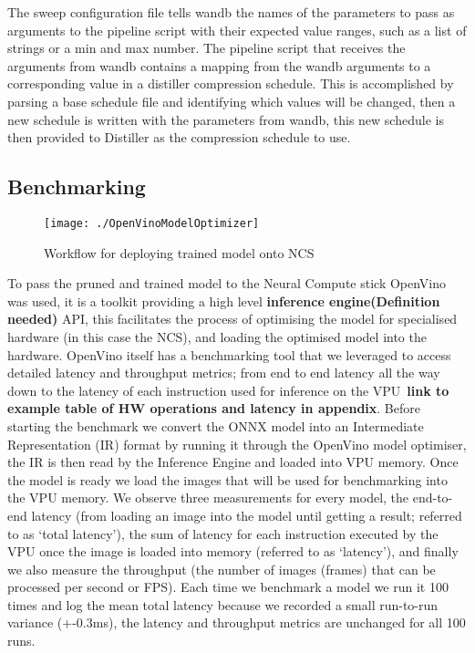 \documentclass[../Dissertation.tex]{subfiles}
\begin{document}
The sweep configuration file tells \acrshort{wandb} the names of the parameters to pass as arguments to the pipeline script with their expected value ranges, such as a list of strings or a min and max number. 
The pipeline script that receives the arguments from \acrshort{wandb} contains a mapping from the \acrshort{wandb} arguments to a corresponding value in a distiller compression schedule.
This is accomplished by parsing a base schedule file and identifying which values will be changed, then a new schedule is written with the parameters from \acrshort{wandb}, this new schedule is then provided to Distiller as the compression schedule to use.



\subsection{Benchmarking}

\begin{figure}[H]
	\centering
	\texttt{[image: ./OpenVinoModelOptimizer]}
	\caption{Workflow for deploying trained model onto NCS~\autocite{ModelOptimizerDeveloper}}
	\label{fig:OpenVinoWorkflow}
\end{figure}


To pass the pruned and trained model to the Neural Compute stick OpenVino was used, it is a toolkit providing a high level \textbf{inference engine(\color{red}Definition needed)} API, this facilitates the process of optimising the model for specialised hardware (in this case the NCS), and loading the optimised model into the hardware. 
OpenVino itself has a benchmarking tool that we leveraged to access detailed latency and throughput metrics; from end to end latency all the way down to the latency of each instruction used for inference on the VPU~\textbf{\color{red}link to example table of HW operations and latency in appendix}. 
Before starting the benchmark we convert the ONNX model into an Intermediate Representation (IR) format by running it through the OpenVino model optimiser, the IR is then read by the Inference Engine and loaded into VPU memory.
Once the model is ready we load the images that will be used for benchmarking into the VPU memory.
We observe three measurements for every model, the end-to-end latency (from loading an image into the model until getting a result; referred to as `total latency'), the sum of latency for each instruction executed by the VPU once the image is loaded into memory (referred to as `latency'), and finally we also measure the throughput (the number of images (frames) that can be processed per second or FPS).
Each time we benchmark a model we run it 100 times and log the mean total latency because we recorded a small run-to-run variance (+-0.3ms), the latency and throughput metrics are unchanged for all 100 runs.
\end{document}
